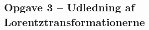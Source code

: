 \documentclass[../main.tex]{subfiles}
\begin{document}






\subsection{Opgave 3 -- Udledning af Lorentztransformationerne}
\setcounter{subsection}{3}
\setcounter{equation}{0}
\end{document}
